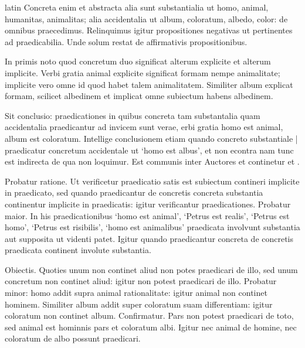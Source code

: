 \begin{otherlanguage*}{latin}
\pstart
Concreta enim et abstracta alia sunt substantialia ut homo, animal, humanitas, animalitas; alia accidentalia ut album, coloratum, albedo, color:
de omnibus praecedimus. Relinquimus igitur propositiones negativas ut pertinentes ad praedicabilia. Unde solum restat de affirmativis propositionibus. 
\pend

\pstart
{}
\pend

\pstart
In primis noto quod concretum duo significat alterum explicite et alterum implicite. Verbi gratia animal explicite significat formam nempe animalitate; implicite vero omne id quod habet talem animalitatem. Similiter album explicat formam, scilicet albedinem et implicat omne subiectum habens albedinem. 
\pend

\pstart
Sit conclusio:
praedicationes in quibus concreta tam substantalia quam accidentalia praedicantur ad invicem sunt verae, erbi gratia homo est animal, album est coloratum. Intellige conclusionem etiam quando concreto substantiale \textnormal{|} praedicatur concretum accidentale ut `homo est albus', et non econtra nam tunc est indirecta de qua non loquimur. Est communis inter Auctores et continetur  et . 
\pend

\pstart
Probatur ratione. Ut verificetur praedicatio satis est subiectum contineri implicite in praedicato, sed quando praedicantur de concretis concreta substantia continentur implicite in praedicatis:
igitur verificantur praedicationes. Probatur maior. In his praedicationibus `homo est animal', `Petrus est realis', `Petrus est homo', `Petrus est risibilis', `homo est animalibus' praedicata involvunt substantia aut supposita ut videnti patet. Igitur quando praedicantur concreta de concretis praedicata continent involute substantia. 
\pend

\pstart
Obiectis. Quoties unum non continet aliud non potes praedicari de illo, sed unum concretum non continet aliud:
igitur non potest praedicari de illo. Probatur minor:
homo addit supra animal rationalitate:
igitur animal non continet hominem. Similiter album addit super coloratum suam differentiam:
igitur coloratum non continet album. Confirmatur. Pars non potest praedicari de toto, sed animal est hominnis pars et coloratum albi. Igitur nec animal de homine, nec coloratum de albo possunt praedicari. 
\pend


\end{otherlanguage*}
